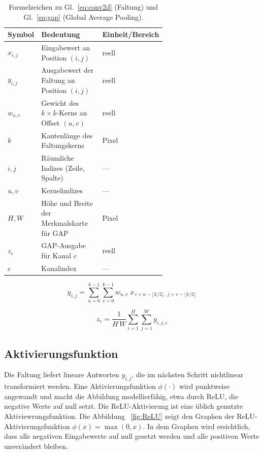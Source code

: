 \begin{table}[htbp]
  \centering
  \caption{Formelzeichen zu Gl.~\eqref{eq:conv2d} (Faltung) und Gl.~\eqref{eq:gap} (Global Average Pooling).}
  \label{tab:formelzeichen-min}
  \renewcommand{\arraystretch}{1.1}
  \begin{tabular}{l p{0.62\linewidth} l}
    \hline
    \textbf{Symbol} & \textbf{Bedeutung} & \textbf{Einheit/Bereich} \\
    \hline
    $x_{i,j}$   & Eingabewert an Position $(i,j)$ & reell \\
    $y_{i,j}$   & Ausgabewert der Faltung an Position $(i,j)$ & reell \\
    $w_{u,v}$   & Gewicht des $k\times k$-Kerns an Offset $(u,v)$ & reell \\
    $k$         & Kantenlänge des Faltungskerns & Pixel \\
    $i,j$       & Räumliche Indizes (Zeile, Spalte) & — \\
    $u,v$       & Kernelindizes & — \\
    $H, W$      & Höhe und Breite der Merkmalskarte für GAP & Pixel \\
    $z_c$       & GAP-Ausgabe für Kanal $c$ & reell \\
    $c$         & Kanalindex & — \\
    \hline
  \end{tabular}
\end{table}


\begin{equation}
  y_{i,j}
  = \sum_{u=0}^{k-1}\sum_{v=0}^{k-1}
    w_{u,v}\; x_{\,i+u-\lfloor k/2 \rfloor,\; j+v-\lfloor k/2 \rfloor}
  \label{eq:conv2d}
\end{equation}

\begin{equation}
  z_c = \frac{1}{H\,W}\sum_{i=1}^{H}\sum_{j=1}^{W} y_{i,j,c}
  \label{eq:gap}
\end{equation}


\subsection{Aktivierungsfunktion}
\label{sec:cnns-activation-batchnorm}
Die Faltung liefert lineare Antworten \(y_{i,j}\), die im nächsten Schritt nichtlinear transformiert werden. Eine Aktivierungsfunktion \(\phi(\cdot)\) wird punktweise angewandt und macht die Abbildung modellierfähig, etwa durch ReLU, die negative Werte auf null setzt.
Die ReLU-Aktivierung ist eine üblich genutzte Aktiviewrungsfunktion. Die Abbildung ~\ref{fig:ReLU} zeigt den Graphen der ReLU-Aktivierungsfunktion \(\phi(x)=\max(0,x)\). In dem Graphen wird ersichtlich, dass alle negativen Eingabewerte auf null gesetzt werden und alle positiven Werte unverändert bleiben. 

